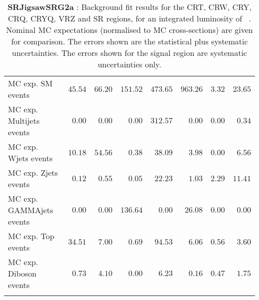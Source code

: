 \begin{table}
\begin{center}
{\begin{tabular*}{\textwidth}{@{\extracolsep{\fill}}lrrrrrrr}
 \noalign{\smallskip}\hline\noalign{\smallskip}
MC exp. SM events              & $45.54$          & $66.20$          & $151.52$          & $473.65$          & $963.26$          & $3.32$          & $23.65$              \\
\noalign{\smallskip}\hline\noalign{\smallskip}
        MC exp. Multijets events         & $0.00$          & $0.00$          & $0.00$          & $312.57$          & $0.00$          & $0.00$          & $0.34$              \\
        MC exp. Wjets events         & $10.18$          & $54.56$          & $0.38$          & $38.09$          & $3.98$          & $0.00$          & $6.56$              \\
        MC exp. Zjets events         & $0.12$          & $0.55$          & $0.05$          & $22.23$          & $1.03$          & $2.29$          & $11.41$              \\
        MC exp. GAMMAjets events         & $0.00$          & $0.00$          & $136.64$          & $0.00$          & $26.08$          & $0.00$          & $0.00$              \\
        MC exp. Top events         & $34.51$          & $7.00$          & $0.69$          & $94.53$          & $6.06$          & $0.56$          & $3.60$              \\
        MC exp. Diboson events         & $0.73$          & $4.10$          & $0.00$          & $6.23$          & $0.16$          & $0.47$          & $1.75$              \\
\noalign{\smallskip}\hline\noalign{\smallskip}
\end{tabular*}
}
\end{center}
\caption{{\bf SRJigsawSRG2a} : Background fit results for the CRT, CRW, CRY, CRQ, CRYQ, VRZ and SR regions, for an integrated luminosity of \ourintlumi~\ifb. Nominal MC expectations (normalised to MC cross-sections) are given for comparison. The errors shown are the statistical plus systematic uncertainties. The errors shown for the signal region are systematic uncertainties only.}
\label{table.results.systematics.in.logL.fit.CRT.CRW.CRY.CRQ.CRYQ.VRZ.SR.SRJigsawSRG2a}
\end{table}
%